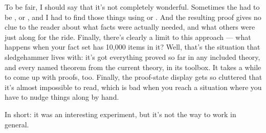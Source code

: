 To be fair, I should say that it's not completely wonderful. Sometimes the  had to be , or , and I had to find those things using  or . And the resulting proof gives no clue to the reader about what facts were actually needed, and what others were just along for the ride. Finally, there's clearly a limit to this approach --- what happens when your fact set has 10,000 items in it? Well, that's the situation that sledgehammer lives with: it's got everything proved so far in any included theory, and every named theorem from the current theory, in its toolbox. It takes a while to come up with proofs, too. Finally, the proof-state display gets so cluttered that it's almost impossible to read, which is bad when you reach a situation where you have to nudge things along by hand. 

In short: it was an interesting experiment, but it's not the way to work in general. 